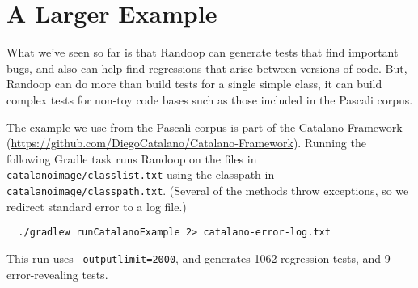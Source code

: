 \documentclass[11pt, oneside]{article} %
\newcommand{\cmd}[1]{{\texttt{#1}}}
\begin{document}
\section{A Larger Example}\label{largerexample}
What we've seen so far is that Randoop can generate tests that find important bugs, and also can help find regressions that arise between versions of code. 
But, Randoop can do more than build tests for a single simple class, it can build complex tests for non-toy code bases such as those included in the Pascali corpus.

The example we use from the Pascali corpus is part of the Catalano Framework (\url{https://github.com/DiegoCatalano/Catalano-Framework}).
Running the following Gradle task runs Randoop on the files in \texttt{catalanoimage/classlist.txt} using the classpath in \texttt{catalanoimage/classpath.txt}.
(Several of the methods throw exceptions, so we redirect standard error to a log file.)
\begin{verbatim}
  ./gradlew runCatalanoExample 2> catalano-error-log.txt
\end{verbatim}
This run uses \cmd{--outputlimit=2000}, and generates 1062 regression tests, and 9 error-revealing tests.
\end{document}
